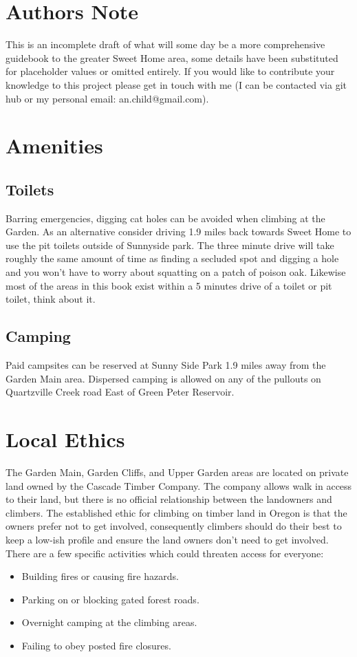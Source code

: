 \section{Authors Note}
This is an incomplete draft of what will some day be a more comprehensive guidebook to the greater Sweet Home area, some details have been substituted for placeholder values or omitted entirely. If you would like to contribute your knowledge to this project please get in touch with me (I can be contacted via git hub or my personal email: an.child@gmail.com).
\section{Amenities}
\subsection*{Toilets}
Barring emergencies, digging cat holes can be avoided when climbing at the Garden. As an alternative consider driving 1.9 miles back towards Sweet Home to use the pit toilets outside of Sunnyside park. The three minute drive will take roughly the same amount of time as finding a secluded spot and digging a hole and you won't have to worry about squatting on a patch of poison oak. Likewise most of the areas in this book exist within a 5 minutes drive of a toilet or pit toilet, think about it. 
\subsection*{Camping}
Paid campsites can be reserved at Sunny Side Park 1.9 miles away from the Garden Main area. Dispersed camping is allowed on any of the pullouts on Quartzville Creek road East of Green Peter Reservoir. 
\section{Local Ethics}
The Garden Main, Garden Cliffs, and Upper Garden areas are located on private land owned by the Cascade Timber Company. The company allows walk in access to their land, but there is no official relationship between the landowners and climbers. The established ethic for climbing on timber land in Oregon is that the owners prefer not to get involved, consequently climbers should do their best to keep a low-ish profile and ensure the land owners don't need to get involved. There are a few specific activities which could threaten access for everyone:\\
\begin{itemize}
\item Building fires or causing fire hazards.\\
\item Parking on or blocking gated forest roads.\\
\item Overnight camping at the climbing areas.\\
\item Failing to obey posted fire closures.\\
\end{itemize}
